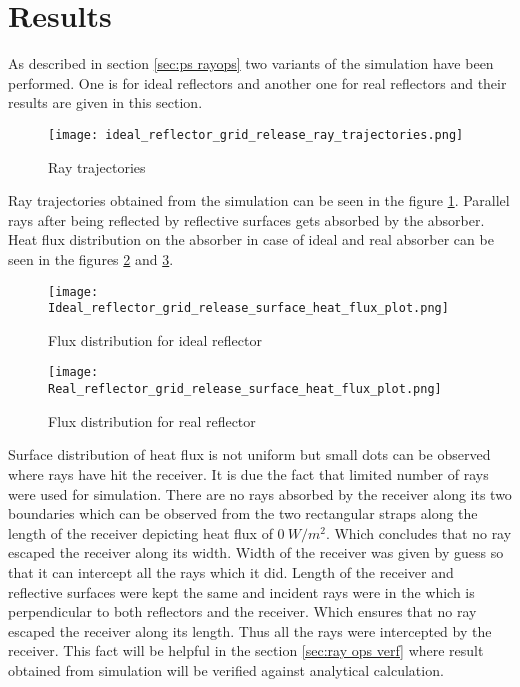 \section{Results}\label{sec:ray ops result}
As described in section \ref{sec:ps rayops} two variants of the simulation have been performed. One is for ideal reflectors and another one for real reflectors and their results are given in this section.

\begin{figure}[H]
\begin{center}
\texttt{[image: ideal\_reflector\_grid\_release\_ray\_trajectories.png]}
\caption{Ray trajectories}
\label{fig:ray ops ray traj}
\end{center}
\end{figure}

Ray trajectories obtained from the simulation can be seen in the figure \ref{fig:ray ops ray traj}. Parallel rays after being reflected by reflective surfaces gets absorbed by the absorber. Heat flux distribution on the absorber in case of ideal and real absorber can be seen in the figures \ref{fig:ray ops heat flux ideal ref} and \ref{fig:ray ops heat flux real ref}.

\begin{figure}[H]
\begin{center}
\texttt{[image: Ideal\_reflector\_grid\_release\_surface\_heat\_flux\_plot.png]}
\caption{Flux distribution for ideal reflector}
\label{fig:ray ops heat flux ideal ref}
\end{center}
\end{figure}

\begin{figure}[H]
\begin{center}
\texttt{[image: Real\_reflector\_grid\_release\_surface\_heat\_flux\_plot.png]}
\caption{Flux distribution for real reflector}
\label{fig:ray ops heat flux real ref}
\end{center}
\end{figure}
Surface distribution of heat flux is not uniform but small dots can be observed where rays have hit the receiver. It is due the fact that limited number of rays were used for simulation. There are no rays absorbed by the receiver along its two boundaries which can be observed from the two rectangular straps along the length of the receiver depicting heat flux of $0\ W/m^2$. Which concludes that no ray escaped the receiver along its width. Width of the receiver was given by guess so that it can intercept all the rays which it did. Length of the receiver and reflective surfaces were kept the same and incident rays were in the which is perpendicular to both reflectors and the receiver. Which ensures that no ray escaped the receiver along its length. Thus all the rays were intercepted by the receiver. This fact will be helpful in the section \ref{sec:ray ops verf} where result obtained from simulation will be verified against analytical calculation.

